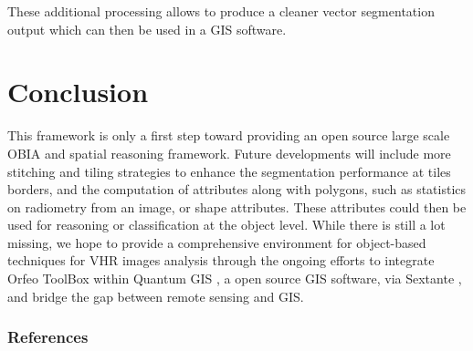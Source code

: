 \documentclass{josis}
\begin{document}
These additional processing allows to produce a cleaner vector
segmentation output which can then be used in a GIS software.

\section{Conclusion}

This framework is only a first step toward providing an open source
large scale OBIA and spatial reasoning framework. Future developments
will include more stitching and tiling strategies to enhance the
segmentation performance at tiles borders, and the computation of
attributes along with polygons, such as statistics on radiometry from
an image, or shape attributes. These attributes could then be used for
reasoning or classification at the object level. While there is still
a lot missing, we hope to provide a comprehensive environment for
object-based techniques for VHR images analysis through the ongoing
efforts to integrate Orfeo ToolBox within Quantum GIS \cite{}, a open
source GIS software, via Sextante \cite{}, and bridge the gap between
remote sensing and GIS.


\subsubsection{References}



\end{document}
